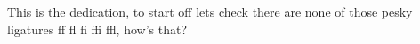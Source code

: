 \begin{dedication}
This is the dedication, to start off lets check there are none of those pesky ligatures ff fl fi ffi ffl, how's that? \lipsum[1]
\end{dedication}